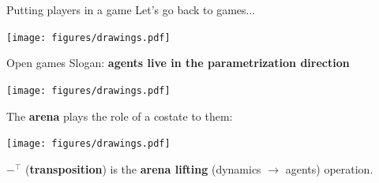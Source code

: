 



\begin{frame}{Putting players in a game}
	Let's go back to games...

	\vfill
	\begin{center}
		\texttt{[image: figures/drawings.pdf]}
	\end{center}


\end{frame}

\begin{frame}{Open games}
	Slogan: \textbf{agents live in the parametrization direction}

	\begin{center}
		\texttt{[image: figures/drawings.pdf]}
	\end{center}

	The \textbf{arena} plays the role of a costate to them:

	\begin{center}
		\texttt{[image: figures/drawings.pdf]}
	\end{center}

	$-^\top$ (\textbf{transposition}) is the \textbf{arena lifting} (dynamics $\to$ agents) operation.
\end{frame}

